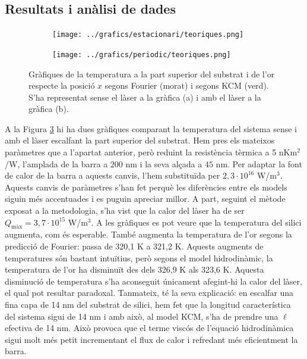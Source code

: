 \documentclass{article}
\begin{document}
\subsection{Resultats i an\`{a}lisi de dades}

\begin{figure}[ht!]
\begin{center}
\begin{subfigure}{.49\textwidth}
\caption{}
\label{Fig:TeoriquesEst}
\texttt{[image: ../grafics/estacionari/teoriques.png]}
\end{subfigure}
\begin{subfigure}{.49\textwidth}
\caption{}
\label{Fig:TeoriquesPer}
\texttt{[image: ../grafics/periodic/teoriques.png]}
\end{subfigure}
\caption{Gr\`{a}fiques de la temperatura a la part superior del substrat i de l'or respecte la posici\'{o} $x$ segons Fourier (morat) i segons KCM (verd). S'ha representat sense el l\`{a}ser a la gr\`{a}fica (a) i amb el l\`{a}ser a la gr\`{a}fica (b).}
\label{Fig:Teoriques}
\end{center}
\end{figure}

A la Figura \ref{Fig:Teoriques} hi ha dues gr\`{a}fiques comparant la temperatura del sistema sense i amb el l\`{a}ser escalfant la part superior del substrat. Hem pres els mateixos par\`{a}metres que a l'apartat anterior, per\`{o} reduint la resist\`{e}ncia t\`{e}rmica a 5 nKm$^2$/W, l'amplada de la barra a $200$ nm i la seva al\c{c}ada a $45$ nm. Per adaptar la font de calor de la barra a aquests canvis, l'hem substitu\"{i}da per $2,3\cdot10^{16}$ W/m$^3$. Aquests canvis de par\`{a}metres s'han fet perqu\`{e} les difer\`{e}ncies entre els models siguin m\'{e}s accentuades i es puguin apreciar millor. A part, seguint el m\`{e}tode exposat a la metodologia, s'ha vist que la calor del l\`{a}ser ha de ser $Q_{\text{m\`{a}x}}=3,7\cdot10^{15}$ W/m$^3$. A les gr\`{a}fiques es pot veure que la temperatura del silici augmenta, com \'{e}s esperable. Tamb\'{e} augmenta la temperatura de l'or segons la predicci\'{o} de Fourier: passa de 320,1 K a 321,2 K. Aquests augments de temperatures s\'{o}n bastant intu\"{i}tius, per\`{o} segons el model hidrodin\`{a}mic, la temperatura de l'or ha disminu\"{i}t des dels 326,9 K als 323,6 K. Aquesta disminuci\'{o} de temperatura s'ha aconseguit \'{u}nicament afegint-hi la calor del l\`{a}ser, el qual pot resultar paradoxal. Tanmateix, t\'{e} la seva explicaci\'{o}: en escalfar una fina capa de 14 nm del substrat de silici, hem fet que la longitud caracter\'{i}stica del sistema sigui de 14 nm i amb aix\`{o}, al model KCM, s'ha de prendre una $\ell$ efectiva de 14 nm. Aix\`{o} provoca que el terme visc\'{o}s de l'equaci\'{o} hidrodin\`{a}mica sigui molt m\'{e}s petit incrementant el flux de calor i refredant m\'{e}s eficientment la barra.
\end{document}
